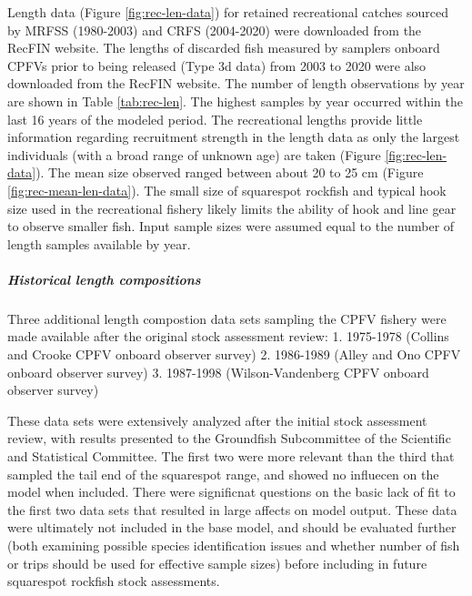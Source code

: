 \documentclass[11pt,
  english,
  a4paper,
]{article}
\begin{document}
Length data (Figure \ref{fig:rec-len-data}) for retained recreational catches sourced by MRFSS (1980-2003) and CRFS (2004-2020) were downloaded from the RecFIN website. The lengths of discarded fish measured by samplers onboard CPFVs prior to being released (Type 3d data) from 2003 to 2020 were also downloaded from the RecFIN website. The number of length observations by year are shown in Table \ref{tab:rec-len}. The highest samples by year occurred within the last 16 years of the modeled period. The recreational lengths provide little information regarding recruitment strength in the length data as only the largest individuals (with a broad range of unknown age) are taken (Figure \ref{fig:rec-len-data}). The mean size observed ranged between about 20 to 25 cm (Figure \ref{fig:rec-mean-len-data}). The small size of squarespot rockfish and typical hook size used in the recreational fishery likely limits the ability of hook and line gear to observe smaller fish. Input sample sizes were assumed equal to the number of length samples available by year.

\leavevmode\tagmcend\tagstructend\par


\hypertarget{historical-length-compositions}{%
\subparagraph{Historical length compositions}\label{historical-length-compositions}}

\leavevmode\tagmcend\tagstructend


Three additional length compostion data sets sampling the CPFV fishery were made available after the original stock assessment review: 1. 1975-1978 (Collins and Crooke CPFV onboard observer survey) 2. 1986-1989 (Alley and Ono CPFV onboard observer survey) 3. 1987-1998 (Wilson-Vandenberg CPFV onboard observer survey)

\leavevmode\tagmcend\tagstructend\par


These data sets were extensively analyzed after the initial stock assessment review, with results presented to the Groundfish Subcommittee of the Scientific and Statistical Committee. The first two were more relevant than the third that sampled the tail end of the squarespot range, and showed no influecen on the model when included. There were significnat questions on the basic lack of fit to the first two data sets that resulted in large affects on model output. These data were ultimately not included in the base model, and should be evaluated further (both examining possible species identification issues and whether number of fish or trips should be used for effective sample sizes) before including in future squarespot rockfish stock assessments.
\end{document}
